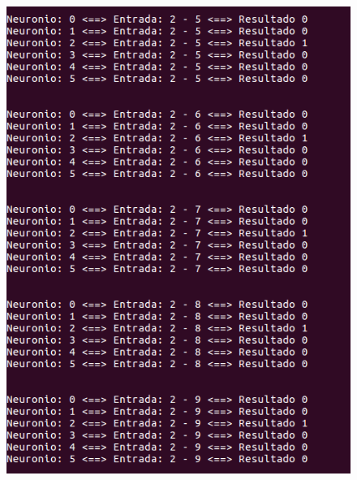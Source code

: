 \documentclass[hidelinks,12pt]{article}
\begin{document}
		\begin{figure}[!h]
			\centering
			\includegraphics[scale=0.5]{Figures/E3S2P2.png}
		\end{figure}
		
\end{document}
